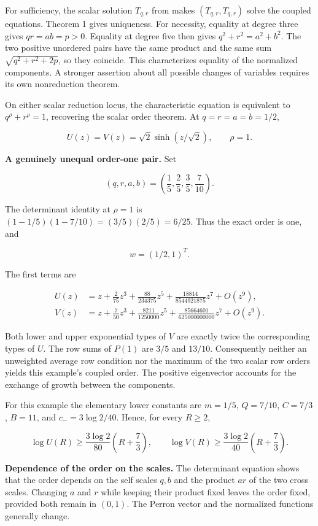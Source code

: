 For sufficiency, the scalar solution \(T_{q,r}\) from
 makes \((T_{q,r},T_{q,r})\)
solve the coupled equations. Theorem 1 gives uniqueness. For necessity,
equality at degree three gives \(qr=ab=p>0\). Equality at degree five
then gives \(q^2+r^2=a^2+b^2\). The two positive unordered pairs have
the same product and the same sum \(\sqrt{q^2+r^2+2p}\), so they
coincide. This characterizes equality of the normalized components. A
stronger assertion about all possible changes of variables requires its
own nonreduction theorem.

On either scalar reduction locus, the characteristic equation is
equivalent to \(q^\rho+r^\rho=1\), recovering the scalar order theorem.
At \(q=r=a=b=1/2\),

\[
U(z)=V(z)=\sqrt2\sinh(z/\sqrt2),\qquad \rho=1.
\]

\textbf{A genuinely unequal order-one pair.} Set

\[
(q,r,a,b)=\left(\frac15,\frac25,\frac35,\frac7{10}\right).
\]

The determinant identity at \(\rho=1\) is
\((1-1/5)(1-7/10)=(3/5)(2/5)=6/25\). Thus the exact order is one, and

\[
w=(1/2,1)^T.
\]

The first terms are

\[
\begin{aligned}
U(z)&=z+\frac2{75}z^3+\frac{88}{234375}z^5
 +\frac{18814}{8544921875}z^7+O(z^9),\\
V(z)&=z+\frac7{50}z^3+\frac{8211}{1250000}z^5
 +\frac{85664601}{625000000000}z^7+O(z^9).
\end{aligned}
\]

Both lower and upper exponential types of \(V\) are exactly twice the
corresponding types of \(U\). The row sums of \(P(1)\) are \(3/5\) and
\(13/10\). Consequently neither an unweighted average row condition nor
the maximum of the two scalar row orders yields this example's coupled
order. The positive eigenvector accounts for the exchange of growth
between the components.

For this example the elementary lower constants are \(m=1/5\),
\(Q=7/10\), \(C=7/3\), \(B=11\), and \(c_-=3\log2/40\). Hence, for every
\(R\ge2\),

\[
\log U(R)\ge\frac{3\log2}{80}\left(R+\frac73\right),\qquad
\log V(R)\ge\frac{3\log2}{40}\left(R+\frac73\right).
\]

\textbf{Dependence of the order on the scales.} The determinant equation
shows that the order depends on the self scales \(q,b\) and the product
\(ar\) of the two cross scales. Changing \(a\) and \(r\) while keeping
their product fixed leaves the order fixed, provided both remain in
\((0,1)\). The Perron vector and the normalized functions generally
change.

